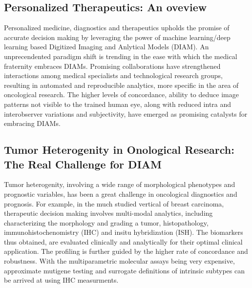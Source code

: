 \documentclass[10pt,journal,compsoc]{IEEEtran}
\begin{document}
%
\IEEEpeerreviewmaketitle




\subsection{Personalized Therapeutics: An oveview}

Personalized medicine, diagnostics and therapeutics upholds the promise of accurate decision making by leveraging the power of machine learning/deep learning based Digitized Imaging and Anlytical Models (DIAM). An unprecendented paradigm shift is trending in the ease with which the medical fraternity embraces DIAMs. Promising collaborations have strengthened interactions among medical specialists and technological research groups, resulting in automated and reproducible analytics, more specific in the area of oncological research. The higher levels of concordance, ability to deduce image patterns not visible to the trained human eye, along with reduced intra and interobserver variations and subjectivity, have emerged as promising catalysts for embracing DIAMs.


\subsection{Tumor Heterogenity in Onological Research: The Real Challenge for DIAM}

Tumor heterogenity, involving a wide range of morphological phenotypes and prognostic variables, has been a great challenge in oncological diagnostics and prognosis. For example, in the much studied vertical of breast carcinoma, therapeutic decision making involves multi-modal analytics, including characterizing the morphology and grading a tumor, histopathology, immunohistochenomistry (IHC) and insitu hybridization (ISH). The biomarkers thus obtained, are evaluated clinically and analytically for their optimal clinical application. The profiling is further guided by the higher rate of concordance and robustness. With the multiparametric molecular assays being very expensive, approximate mutigene testing and surrogate definitions of intrinsic subtypes can be arrived at using IHC measurments.
\end{document}
